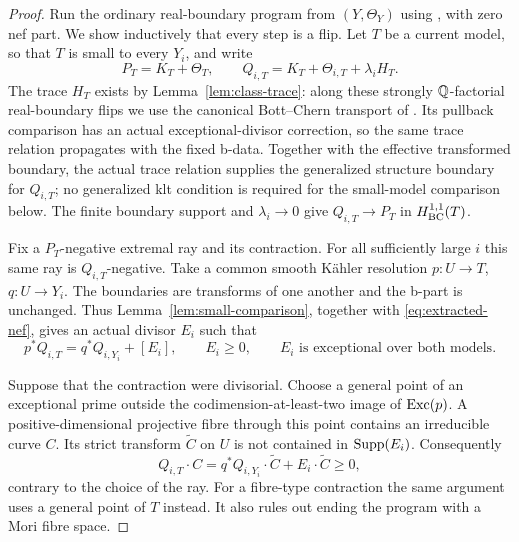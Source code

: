 \begin{proof}
Run the ordinary real-boundary program from $(Y,\Theta_Y)$ using
\cite[Proposition~4.2]{HX2026}, with zero nef part.
We show inductively that every step is a flip.  Let $T$ be a current
model, so that $T$ is small to every $Y_i$, and write
\[
 P_T=K_T+\Theta_T,\qquad
 Q_{i,T}=K_T+\Theta_{i,T}+\lambda_i H_T .
\]
The trace $H_T$ exists by Lemma~\ref{lem:class-trace}: along these
strongly $\mathbb Q$-factorial real-boundary flips we use the canonical
Bott--Chern transport of \cite[Proposition~4.2]{HX2026}.  Its pullback
comparison has an actual exceptional-divisor correction, so the same
trace relation propagates with the fixed b-data.
Together with the effective transformed boundary, the actual trace
relation supplies the generalized structure boundary for $Q_{i,T}$;
no generalized klt condition is required for the small-model comparison
below. The finite boundary support and
$\lambda_i\to0$ give $Q_{i,T}\to P_T$ in $H^{1,1}_{\mathrm{BC}}(T)$.

Fix a $P_T$-negative extremal ray and its contraction.  For all sufficiently
large $i$ this same ray is $Q_{i,T}$-negative.  Take a common smooth
Kähler resolution $p:U\to T$, $q:U\to Y_i$.  The boundaries are transforms
of one another and the b-part is unchanged.  Thus
Lemma~\ref{lem:small-comparison}, together with
\eqref{eq:extracted-nef}, gives an actual divisor $E_i$ such that
\begin{equation}
 p^*Q_{i,T}=q^*Q_{i,Y_i}+[E_i],
 \qquad E_i\ge0,
 \qquad E_i\text{ is exceptional over both models}.
 \label{eq:limit-comparison}
\end{equation}

Suppose that the contraction were divisorial.  Choose a general point
of an exceptional prime outside the codimension-at-least-two image of
$\operatorname{Exc}(p)$.  A positive-dimensional projective fibre through this point
contains an irreducible curve $C$.  Its strict transform $\widetilde C$
on $U$ is not contained in $\operatorname{Supp}(E_i)$.  Consequently
\[
 Q_{i,T}\cdot C
   =q^*Q_{i,Y_i}\cdot\widetilde C+E_i\cdot\widetilde C\ge0,
\]
contrary to the choice of the ray.  For a fibre-type contraction the
same argument uses a general point of $T$ instead.  It also rules out
ending the program with a Mori fibre space.


\end{proof}

